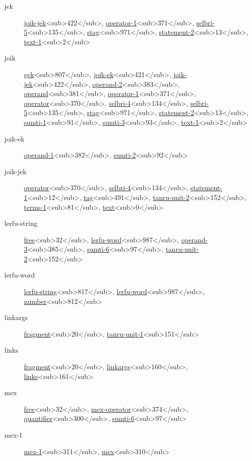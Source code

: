\begin{description}
\item[jek] \hyperref[html:b422]{joik-jek}<sub>422</sub>, \hyperref[html:b371]{operator-1}<sub>371</sub>, \hyperref[html:b135]{selbri-5}<sub>135</sub>, \hyperref[html:b971]{stag}<sub>971</sub>, \hyperref[html:b13]{statement-2}<sub>13</sub>, \hyperref[html:b2]{text-1}<sub>2</sub>
\item[joik] \hyperref[html:b807]{gek}<sub>807</sub>, \hyperref[html:b421]{joik-ek}<sub>421</sub>, \hyperref[html:b422]{joik-jek}<sub>422</sub>, \hyperref[html:b383]{operand-2}<sub>383</sub>, \hyperref[html:b381]{operand}<sub>381</sub>, \hyperref[html:b371]{operator-1}<sub>371</sub>, \hyperref[html:b370]{operator}<sub>370</sub>, \hyperref[html:b134]{selbri-4}<sub>134</sub>, \hyperref[html:b135]{selbri-5}<sub>135</sub>, \hyperref[html:b971]{stag}<sub>971</sub>, \hyperref[html:b13]{statement-2}<sub>13</sub>, \hyperref[html:b91]{sumti-1}<sub>91</sub>, \hyperref[html:b93]{sumti-3}<sub>93</sub>, \hyperref[html:b2]{text-1}<sub>2</sub>
\item[joik-ek] \hyperref[html:b382]{operand-1}<sub>382</sub>, \hyperref[html:b92]{sumti-2}<sub>92</sub>
\item[joik-jek] \hyperref[html:b370]{operator}<sub>370</sub>, \hyperref[html:b134]{selbri-4}<sub>134</sub>, \hyperref[html:b12]{statement-1}<sub>12</sub>, \hyperref[html:b491]{tag}<sub>491</sub>, \hyperref[html:b152]{tanru-unit-2}<sub>152</sub>, \hyperref[html:b81]{terms-1}<sub>81</sub>, \hyperref[html:b0]{text}<sub>0</sub>
\item[lerfu-string] \hyperref[html:b32]{free}<sub>32</sub>, \hyperref[html:b987]{lerfu-word}<sub>987</sub>, \hyperref[html:b385]{operand-3}<sub>385</sub>, \hyperref[html:b97]{sumti-6}<sub>97</sub>, \hyperref[html:b152]{tanru-unit-2}<sub>152</sub>
\item[lerfu-word] \hyperref[html:b817]{lerfu-string}<sub>817</sub>, \hyperref[html:b987]{lerfu-word}<sub>987</sub>, \hyperref[html:b812]{number}<sub>812</sub>
\item[linkargs] \hyperref[html:b20]{fragment}<sub>20</sub>, \hyperref[html:b151]{tanru-unit-1}<sub>151</sub>
\item[links] \hyperref[html:b20]{fragment}<sub>20</sub>, \hyperref[html:b160]{linkargs}<sub>160</sub>, \hyperref[html:b161]{links}<sub>161</sub>
\item[mex] \hyperref[html:b32]{free}<sub>32</sub>, \hyperref[html:b374]{mex-operator}<sub>374</sub>, \hyperref[html:b300]{quantifier}<sub>300</sub>, \hyperref[html:b97]{sumti-6}<sub>97</sub>
\item[mex-1] \hyperref[html:b311]{mex-1}<sub>311</sub>, \hyperref[html:b310]{mex}<sub>310</sub>

\end{description}
